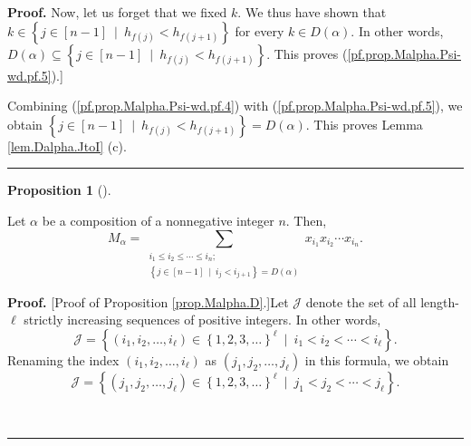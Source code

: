 \documentclass[numbers=enddot,12pt,final,onecolumn,notitlepage,abstracton]{scrartcl}
\theoremstyle{definition}
\newtheorem{prop}[theo]{Proposition}
\newenvironment{proposition}[1][]
{\begin{prop}[#1]\begin{leftbar}}
{\end{leftbar}\end{prop}}
\newenvironment{proof}[1][Proof]{\noindent\textbf{#1.} }{\ \rule{0.5em}{0.5em}}
\let\sumnonlimits\sum
\renewcommand{\sum}{\sumnonlimits\limits}
\newenvironment{verlong}{}{}
\begin{document}
\begin{verlong}
\begin{footnotesize}
\begin{proof}
Now, let us forget that we fixed $k$. We thus have shown that $k\in\left\{
j\in\left[  n-1\right]  \ \mid\ h_{f\left(  j\right)  }<h_{f\left(
j+1\right)  }\right\}  $ for every $k\in D\left(  \alpha\right)  $. In other
words, $D\left(  \alpha\right)  \subseteq\left\{  j\in\left[  n-1\right]
\ \mid\ h_{f\left(  j\right)  }<h_{f\left(  j+1\right)  }\right\}  $. This
proves (\ref{pf.prop.Malpha.Psi-wd.pf.5}).]

Combining (\ref{pf.prop.Malpha.Psi-wd.pf.4}) with
(\ref{pf.prop.Malpha.Psi-wd.pf.5}), we obtain $\left\{  j\in\left[
n-1\right]  \ \mid\ h_{f\left(  j\right)  }<h_{f\left(  j+1\right)  }\right\}
=D\left(  \alpha\right)  $. This proves Lemma \ref{lem.Dalpha.JtoI} (c).
\end{proof}

\begin{proposition}
\label{prop.Malpha.D}Let $\alpha$ be a composition of a nonnegative integer
$n$. Then,%
\[
M_{\alpha}=\sum_{\substack{i_{1}\leq i_{2}\leq\cdots\leq i_{n};\\\left\{
j\in\left[  n-1\right]  \ \mid\ i_{j}<i_{j+1}\right\}  =D\left(
\alpha\right)  }}x_{i_{1}}x_{i_{2}}\cdots x_{i_{n}}.
\]

\end{proposition}

\begin{proof}
[Proof of Proposition \ref{prop.Malpha.D}.]Let $\mathcal{J}$ denote the set of
all length-$\ell$ strictly increasing sequences of positive integers. In other
words,%
\begin{equation}
\mathcal{J}=\left\{  \left(  i_{1},i_{2},\ldots,i_{\ell}\right)  \in\left\{
1,2,3,\ldots\right\}  ^{\ell}\ \mid\ i_{1}<i_{2}<\cdots<i_{\ell}\right\}  .
\label{pf.prop.Malpha.D.J=}%
\end{equation}
Renaming the index $\left(  i_{1},i_{2},\ldots,i_{\ell}\right)  $ as $\left(
j_{1},j_{2},\ldots,j_{\ell}\right)  $ in this formula, we obtain
\[
\mathcal{J}=\left\{  \left(  j_{1},j_{2},\ldots,j_{\ell}\right)  \in\left\{
1,2,3,\ldots\right\}  ^{\ell}\ \mid\ j_{1}<j_{2}<\cdots<j_{\ell}\right\}  .
\]



\end{proof}
\end{footnotesize}
\end{verlong}
\end{document}
